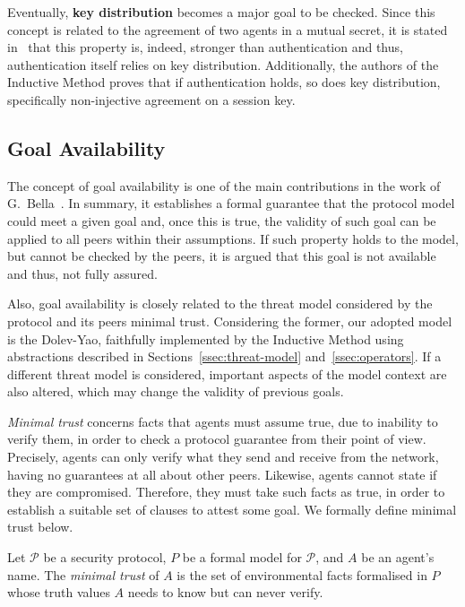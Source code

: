 Eventually, \textbf{key distribution} becomes a major goal to be checked. Since this concept is related to the agreement of two agents in a mutual secret, it is stated in~\cite{BellareRogaway93} that this property is, indeed, stronger than authentication and thus, authentication itself relies on key distribution. Additionally, the authors of the Inductive Method proves that if authentication holds, so does key distribution, specifically non-injective agreement on a session key.



\subsection{Goal Availability}
The concept of goal availability is one of the main contributions in the work of G.~Bella~\cite{Bella2007}. In summary, it establishes a formal guarantee that the protocol model could meet a given goal and, once this is true, the validity of such goal can be applied to all peers within their assumptions. If such property holds to the model, but cannot be checked by the peers, it is argued that this goal is not available and thus, not fully assured.

Also, goal availability is closely related to the threat model considered by the protocol and its peers minimal trust. Considering the former, our adopted model is the Dolev-Yao, faithfully implemented by the Inductive Method using abstractions described in Sections~\ref{ssec:threat-model} and~\ref{ssec:operators}. If a different threat model is considered, important aspects of the model context are also altered, which may change the validity of previous goals.

\textit{Minimal trust} concerns facts that agents must assume true, due to inability to verify them, in order to check a protocol guarantee from their point of view. Precisely, agents can only verify what they send and receive from the network, having no guarantees at all about other peers. Likewise, agents cannot state if they are compromised. Therefore, they must take such facts as true, in order to establish a suitable set of clauses to attest some goal. We formally define minimal trust below.

\begin{definition}
  Let \(\mathcal{P}\) be a security protocol, \(P\) be a formal model for \(\mathcal{P}\), and \(A\) be an agent's name. The \textit{minimal trust} of \(A\) is the set of environmental facts formalised in \(P\) whose truth values \(A\) needs to know but can never verify.
\end{definition}

